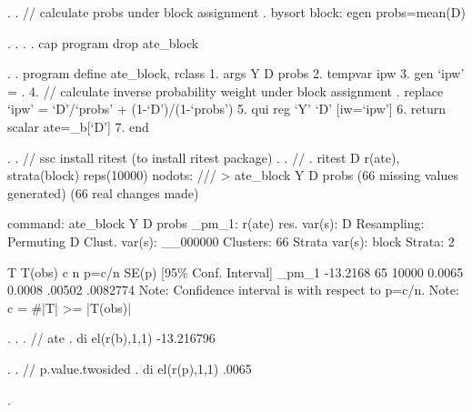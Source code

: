 . 
. // calculate probs under block assignment
. bysort block: egen probs=mean(D)

. 
. 
. 
. cap program drop ate_block

. 
. program define ate_block, rclass
  1. args Y D probs
  2. tempvar ipw
  3. gen `ipw' = .
  4. // calculate inverse probability weight under block assignment
. replace `ipw' = `D'/`probs' + (1-`D')/(1-`probs')
  5. qui reg `Y' `D' [iw=`ipw']
  6. return scalar ate=_b[`D']
  7. end 

. 
. // ssc install ritest (to install ritest package)
. 
. //
. ritest D r(ate), strata(block) reps(10000) nodots: ///
> ate_block Y D probs
(66 missing values generated)
(66 real changes made)

      command:  ate_block Y D probs
        _pm_1:  r(ate)
  res. var(s):  D
   Resampling:  Permuting D
Clust. var(s):  __000000
     Clusters:  66
Strata var(s):  block
       Strata:  2

T            {\VBAR}     T(obs)       c       n   p=c/n   SE(p) [95\% Conf. Interval]
       _pm_1 {\VBAR}   -13.2168      65   10000  0.0065  0.0008    .00502   .0082774
Note: Confidence interval is with respect to p=c/n.
Note: c = \#{\lbr}|T| >= |T(obs)|{\rbr}

. 
. 
. // ate
. di el(r(b),1,1)
-13.216796

. 
. // p.value.twosided
. di el(r(p),1,1)
.0065

. 
